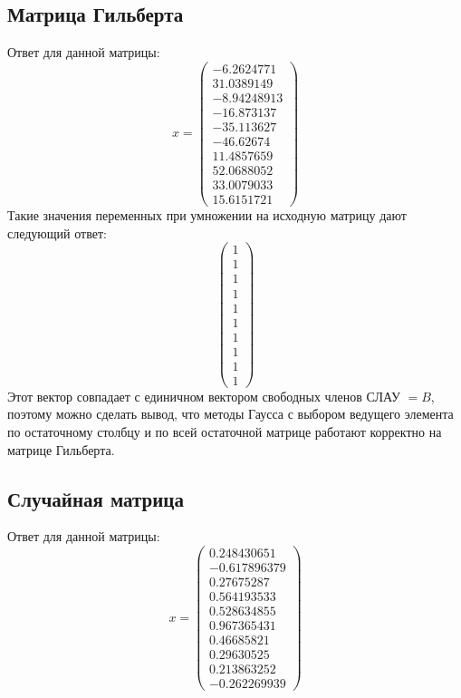 \documentclass[../../report.tex]{subfiles}
\begin{document}
\subsection{Матрица Гильберта}
Ответ для данной матрицы:
\[
x = 
\begin{pmatrix} 
-6.2624771 \\
31.0389149 \\
-8.94248913 \\
-16.873137 \\
-35.113627 \\
-46.62674 \\
11.4857659 \\
52.0688052 \\
33.0079033 \\
15.6151721
\end{pmatrix}
\]
Такие значения переменных при умножении на исходную матрицу дают следующий ответ:
\[
\begin{pmatrix}
1 \\
1 \\
1 \\
1 \\
1 \\
1 \\
1 \\
1 \\
1 \\
1
\end{pmatrix}
\]
Этот вектор совпадает с единичном вектором свободных членов СЛАУ $= B$, поэтому можно сделать вывод, что методы Гаусса с выбором ведущего элемента по остаточному столбцу и по всей остаточной матрице работают корректно на матрице Гильберта.

\subsection{Случайная матрица}
Ответ для данной матрицы:
\[
x = 
\begin{pmatrix} 
0.248430651 \\ 
-0.617896379 \\
0.27675287 \\
0.564193533 \\
0.528634855 \\
0.967365431 \\
0.46685821 \\
0.29630525 \\
0.213863252 \\
-0.262269939
\end{pmatrix}
\]
\end{document}
